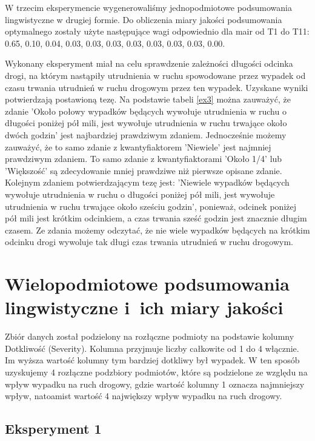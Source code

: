 \documentclass{classrep}
\begin{document}
W trzecim eksperymencie wygenerowaliśmy jednopodmiotowe podsumowania lingwistyczne w drugiej formie. Do obliczenia miary jakości podsumowania optymalnego zostały użyte następujące wagi odpowiednio dla mair od T1 do T11: 0.65, 0.10, 0.04, 0.03, 0.03, 0.03, 0.03, 0.03, 0.03, 0.03, 0.00. 

Wykonany eksperyment miał na celu sprawdzenie zależności długości odcinka drogi, na którym nastąpiły utrudnienia w ruchu spowodowane przez wypadek od czasu trwania utrudnień w ruchu drogowym przez ten wypadek. Uzyskane wyniki potwierdzają postawioną tezę. Na podstawie tabeli \ref{ex3} można zauważyć, że zdanie 'Około połowy wypadków będących wywołuje utrudnienia w ruchu o długości poniżej pół mili, jest wywołuje utrudnienia w ruchu trwające około dwóch godzin' jest najbardziej prawdziwym zdaniem. Jednocześnie możemy zauważyć, że to samo zdanie z kwantyfiaktorem 'Niewiele' jest najmniej prawdziwym zdaniem. To samo zdanie z kwantyfiaktorami 'Około 1/4' lub 'Większość' są zdecydowanie mniej prawdziwe niż pierwsze opisane zdanie. Kolejnym zdaniem potwierdzającym tezę jest: 'Niewiele wypadków będących wywołuje utrudnienia w ruchu o długości poniżej pół mili, jest wywołuje utrudnienia w ruchu trwające około sześciu godzin', ponieważ, odcinek poniżej pół mili jest krótkim odcinkiem, a czas trwania sześć godzin jest znacznie długim czasem. Ze zdania możemy odczytać, że nie wiele wypadków będących na krótkim odcinku drogi wywoluje tak długi czas trwania utrudnień w ruchu drogowym.


\section{Wielopodmiotowe podsumowania lingwistyczne i~ich miary jakości} 
\label{section:ex_wiel}

Zbiór danych został podzielony na rozłączne podmioty na podstawie kolumny Dotkliwość (Severity). Kolumna przyjmuje liczby całkowite od 1 do 4 włącznie. Im wyższa wartość kolumny tym bardziej dotkliwy był wypadek. W ten sposób uzyskujemy 4 rozłączne podzbiory podmiotów, które są podzielone ze względu na wpływ wypadku na ruch drogowy, gdzie wartość kolumny 1 oznacza najmniejszy wpływ, natoamist wartość 4 największy wpływ wypadku na ruch drogowy. 


\subsection{Eksperyment 1}
\label{section:ex_wiel1}
\end{document}
